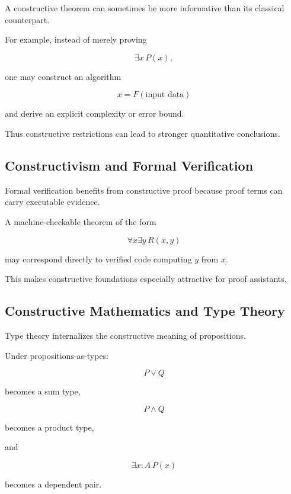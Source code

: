 A constructive theorem can sometimes be more informative than its classical
counterpart.

For example, instead of merely proving

\[
\exists x\,P(x),
\]

one may construct an algorithm

\[
\boxed{
x=F(\text{input data})
}
\]

and derive an explicit complexity or error bound.

Thus constructive restrictions can lead to stronger quantitative
conclusions.

\subsection{Constructivism and Formal Verification}
\label{subsec:constructivism-formal-verification}

Formal verification benefits from constructive proof because proof terms can
carry executable evidence.

A machine-checkable theorem of the form

\[
\forall x
\exists y\,R(x,y)
\]

may correspond directly to verified code computing \(y\) from \(x\).

This makes constructive foundations especially attractive for proof
assistants.

\subsection{Constructive Mathematics and Type Theory}
\label{subsec:constructive-mathematics-type-theory}

Type theory internalizes the constructive meaning of propositions.

Under propositions-as-types:

\[
\boxed{
P\lor Q
}
\]

becomes a sum type,

\[
\boxed{
P\land Q
}
\]

becomes a product type,

and

\[
\boxed{
\exists x:A\,P(x)
}
\]

becomes a dependent pair.

